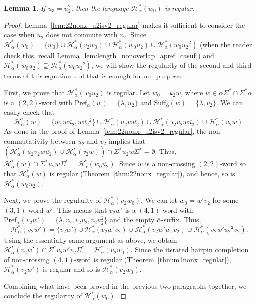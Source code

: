 \documentclass{article}
\theoremstyle{plain}
\newtheorem{lemma}{Lemma}
\theoremstyle{remark}
\newcommand{\HC}{\ensuremath{\mathcal{H}}}
\newcommand{\Pref}{\ensuremath{\mathrm{Pref}}}
\newcommand{\Suff}{\ensuremath{\mathrm{Suff}}}
\newcommand{\calpha}{\ensuremath{\overline{\alpha}}}
\begin{document}
\begin{lemma}
	If $u_3 = u_2^2$, then the language $\HC_\alpha^*(w_0)$ is regular. 
\end{lemma}
\begin{proof}
	Lemma~\ref{lem:22nonx_u2isv2_regular} makes it sufficient to consider the case when $u_2$ does not commute with $v_2$. 
	Since $\HC_\alpha^*(w_0) = \{w_0\} \cup \HC_\alpha^*(v_2 w_0) \cup \HC_\alpha^*(w_0 \overline{u_2}) \cup \HC_\alpha^*(w_0 \overline{u_2}^2)$ (when the reader check this, recall Lemma~\ref{lem:length_nonoverlap_apref_casuf}) and $\HC_\alpha^*(w_0\overline{u_2}) \supseteq \HC_\alpha^*(w_0\overline{u_2}^2)$, we will show the regularity of the second and third terms of this equation and that is enough for our purpose. 

	First, we prove that $\HC_\alpha^*(w_0 \overline{u_2})$ is regular. 
	Let $w_0 = u_2 w$, where $w \in \alpha \Sigma^* \cap \Sigma^* \calpha$ is a $(2, 2)$-word with $\Pref_\alpha(w) = \{\lambda, u_2\}$ and $\Suff_{\calpha}(w) = \{\lambda, \overline{v_2}\}$. 
	We can easily check that 
	\[
		\HC_\alpha^*(w) = \{w, w\overline{u_2}, w \overline{u_2}^2\} \cup \HC_\alpha^*(u_2 w \overline{u_2}) \cup \HC_\alpha^*(u_2 v_2 w \overline{u_2}) \cup \HC_\alpha^*(v_2w). 
	\]
	As done in the proof of Lemma~\ref{lem:22nonx_u2isv2_regular}, the non-commutativity between $u_2$ and $v_2$ implies that $(\HC_\alpha^*(u_2 v_2 w \overline{u_2}) \cup \HC_\alpha^*(v_2w)) \cap \Sigma^* u_2 w \Sigma^* = \emptyset$. 
	Thus, $\HC_\alpha^*(w) \cap \Sigma^* u_2 w \Sigma^* = \HC_\alpha^*(w_0 \overline{u_2})$. 
	Since $w$ is a non-crossing $(2, 2)$-word so that $\HC_\alpha^*(w)$ is regular (Theorem~\ref{thm:22nonx_regular}), and hence, so is $\HC_\alpha^*(w_0 \overline{u_2})$. 

	Next, we prove the regularity of $\HC_\alpha^*(v_2 w_0)$. 
	We can let $w_0 = w'\overline{v_2}$ for some $(3, 1)$-word $w'$. 
	This means that $v_2 w'$ is a $(4, 1)$-word with $\Pref_\alpha(v_2w') = \{\lambda, v_2, v_2u_2, v_2u_2^2\}$ and the empty $\calpha$-suffix. 
	Thus, 
	\[
		\HC_\alpha^*(v_2w') = \{v_2w'\} \cup \HC_\alpha^*(v_2w'\overline{v_2}) \cup \HC_\alpha^*(v_2w'\overline{u_2} \ \overline{v_2}) \cup \HC_\alpha^*(v_2w'\overline{u_2}^2 \overline{v_2}). 
	\]
	Using the essentially same argument as above, we obtain $\HC_\alpha^*(v_2w') \cap \Sigma^* v_2 w' \overline{v_2} \Sigma^* = \HC_\alpha^*(v_2w_0)$. 
	Since the iterated hairpin completion of non-crossing $(4, 1)$-word is regular (Theorem~\ref{thm:m1nonx_regular}), $\HC_\alpha^*(v_2w')$ is regular and so is $\HC_\alpha^*(v_2w_0)$. 

	Combining what have been proved in the previous two paragraphs together, we conclude the regularity of $\HC_\alpha^*(w_0)$. 
\end{proof}
\end{document}

